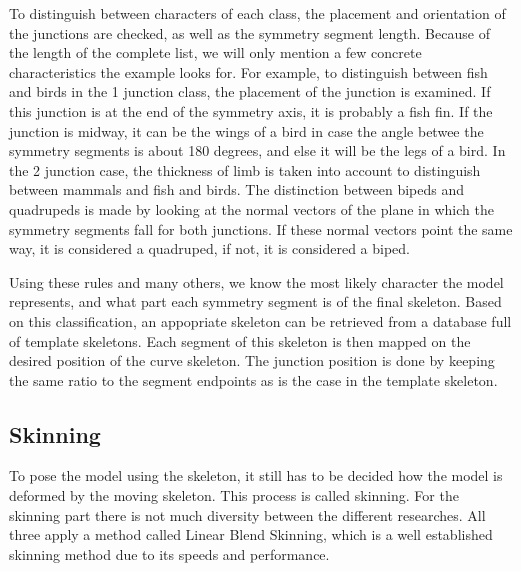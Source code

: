 \documentclass{article}
\begin{document}
To distinguish between characters of each class, the placement and orientation
of the junctions are checked, as well as the symmetry segment length. Because
of the length of the complete list, we will only mention a few concrete
characteristics the example looks for. For example, to distinguish between
fish and birds in the 1 junction class, the placement of the junction is
examined. If this junction is at the end of the symmetry axis, it is probably a
fish fin. If the junction is midway, it can be the wings of a bird in case the
angle betwee the symmetry segments is about 180 degrees, and else it will be the
legs of a bird. In the 2 junction case, the thickness of
limb is taken into account to distinguish between mammals and fish and birds.
The distinction between bipeds and quadrupeds is made by looking at the normal
vectors of the plane in which the symmetry segments fall for both junctions. If
these normal vectors point the same way, it is considered a quadruped, if not,
it is considered a biped. 

Using these rules and many others, we know the most likely character the model represents, and
what part each symmetry segment is of the final skeleton. Based on this
classification, an appopriate skeleton can be retrieved from a database full of
template skeletons. Each segment of this skeleton is then mapped on the desired
position of the curve skeleton. The junction position is done by keeping the
same ratio to the segment endpoints as is the case in the template skeleton.


%

\subsection{Skinning}
To pose the model using the skeleton, it still has to be decided how the model
is deformed by the moving skeleton. This process is called skinning. For the
skinning part there is not much diversity between the different researches. All
three apply a method called Linear Blend Skinning, which is a well established skinning method due
to its speeds and performance.
\end{document}
